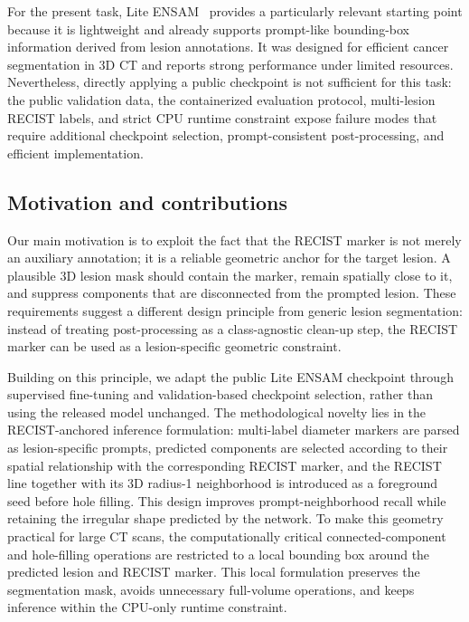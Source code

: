 \documentclass[runningheads]{llncs}
\begin{document}
For the present task, Lite ENSAM~\cite{bjornstad2025lite} provides a particularly relevant starting point because it is lightweight and already supports prompt-like bounding-box information derived from lesion annotations. It was designed for efficient cancer segmentation in 3D CT and reports strong performance under limited resources. Nevertheless, directly applying a public checkpoint is not sufficient for this task: the public validation data, the containerized evaluation protocol, multi-lesion RECIST labels, and strict CPU runtime constraint expose failure modes that require additional checkpoint selection, prompt-consistent post-processing, and efficient implementation.

\subsection{Motivation and contributions}
Our main motivation is to exploit the fact that the RECIST marker is not merely an auxiliary annotation; it is a reliable geometric anchor for the target lesion. A plausible 3D lesion mask should contain the marker, remain spatially close to it, and suppress components that are disconnected from the prompted lesion. These requirements suggest a different design principle from generic lesion segmentation: instead of treating post-processing as a class-agnostic clean-up step, the RECIST marker can be used as a lesion-specific geometric constraint.

Building on this principle, we adapt the public Lite ENSAM checkpoint through supervised fine-tuning and validation-based checkpoint selection, rather than using the released model unchanged. The methodological novelty lies in the RECIST-anchored inference formulation: multi-label diameter markers are parsed as lesion-specific prompts, predicted components are selected according to their spatial relationship with the corresponding RECIST marker, and the RECIST line together with its 3D radius-1 neighborhood is introduced as a foreground seed before hole filling. This design improves prompt-neighborhood recall while retaining the irregular shape predicted by the network. To make this geometry practical for large CT scans, the computationally critical connected-component and hole-filling operations are restricted to a local bounding box around the predicted lesion and RECIST marker. This local formulation preserves the segmentation mask, avoids unnecessary full-volume operations, and keeps inference within the CPU-only runtime constraint.
\end{document}
